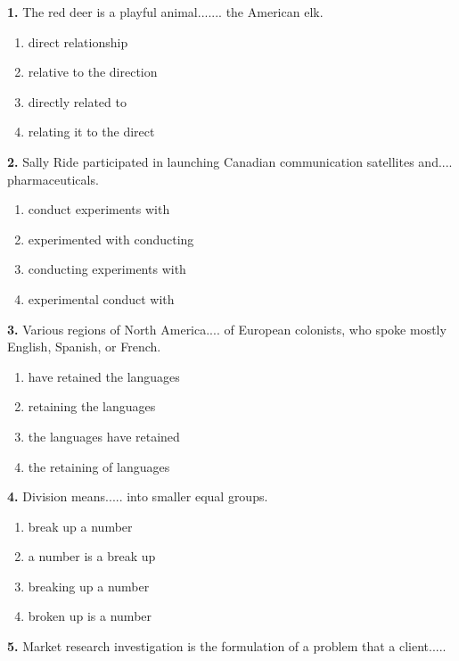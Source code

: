 \documentclass[12pt]{article}
\begin{document}
\noindent\textbf{1.} The red deer is a playful animal....... the American elk.
\begin{enumerate}[label=(\Alph*),leftmargin=*,itemsep=0.2em]
\item direct relationship
\item relative to the direction
\item directly related to
\item relating it to the direct
\end{enumerate}
\par
\vspace{0.25\baselineskip}
\noindent\textbf{2.} Sally Ride participated in launching Canadian communication satellites and.... pharmaceuticals.
\begin{enumerate}[label=(\Alph*),leftmargin=*,itemsep=0.2em]
\item conduct experiments with
\item experimented with conducting
\item conducting experiments with
\item experimental conduct with
\end{enumerate}
\par
\vspace{0.25\baselineskip}
\noindent\textbf{3.} Various regions of North America.... of European colonists, who spoke mostly English, Spanish, or French.
\begin{enumerate}[label=(\Alph*),leftmargin=*,itemsep=0.2em]
\item have retained the languages
\item retaining the languages
\item the languages have retained
\item the retaining of languages
\end{enumerate}
\par
\vspace{0.25\baselineskip}
\noindent\textbf{4.} Division means..... into smaller equal groups.
\begin{enumerate}[label=(\Alph*),leftmargin=*,itemsep=0.2em]
\item break up a number
\item a number is a break up
\item breaking up a number
\item broken up is a number
\end{enumerate}
\par
\vspace{0.25\baselineskip}
\noindent\textbf{5.} Market research investigation is the formulation of a problem that a client.....
\end{document}
